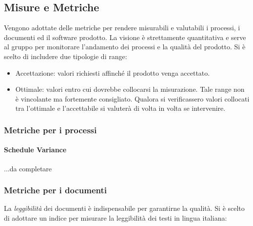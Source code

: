 			

	
	\subsection{Misure e Metriche}
	\label{MisureMetriche}
	Vengono adottate delle metriche per rendere misurabili e valutabili i processi, i documenti ed il software prodotto. La visione è strettamente quantitativa e serve al gruppo per monitorare l'andamento dei processi e la qualità del prodotto. Si è scelto di includere due tipologie di range:
	\begin{itemize}
		\item Accettazione: valori richiesti affinché il prodotto venga accettato.
		\item Ottimale: valori entro cui dovrebbe collocarsi la misurazione. Tale range non è vincolante ma fortemente consigliato. Qualora si verificassero valori collocati tra l'ottimale e l'accettabile si valuterà di volta in volta se intervenire.
	\end{itemize}
		
		\subsubsection{Metriche per i processi}
			\paragraph{Schedule Variance}		
			...da completare	
			
		\subsubsection{Metriche per i documenti}
		La \emph{leggibilità} dei documenti è indispensabile per garantirne la qualità. Si è scelto di adottare un indice per misurare la leggibilità dei testi in lingua italiana:
